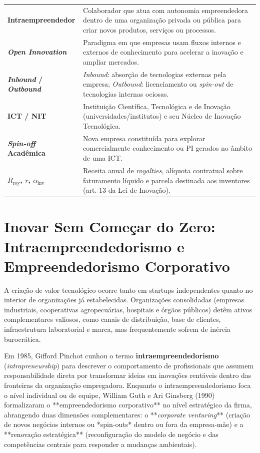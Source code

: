 
\begin{boxSimbolo}
  \begin{tabularx}{\textwidth}{@{}l >{\raggedright\arraybackslash}X@{}}
    \textbf{Intraempreendedor} & Colaborador que atua com autonomia empreendedora dentro de uma organização privada ou pública para criar novos produtos, serviços ou processos. \\
    \textbf{\textit{Open Innovation}} & Paradigma em que empresas usam fluxos internos e externos de conhecimento para acelerar a inovação e ampliar mercados. \\
    \textbf{\textit{Inbound} / \textit{Outbound}} & \textit{Inbound}: absorção de tecnologias externas pela empresa; \textit{Outbound}: licenciamento ou \textit{spin-out} de tecnologias internas ociosas. \\
    \textbf{ICT / NIT} & Instituição Científica, Tecnológica e de Inovação (universidades/institutos) e seu Núcleo de Inovação Tecnológica. \\
    \textbf{\textit{Spin-off} Acadêmica} & Nova empresa constituída para explorar comercialmente conhecimento ou PI gerados no âmbito de uma ICT. \\
    \textbf{$R_{\text{roy}}$, $r$, $\alpha_{\text{inv}}$} & Receita anual de \textit{royalties}, alíquota contratual sobre faturamento líquido e parcela destinada aos inventores (art. 13 da Lei de Inovação). \\
  \end{tabularx}
\end{boxSimbolo}

\section{Inovar Sem Começar do Zero: Intraempreendedorismo e Empreendedorismo Corporativo}

A criação de valor tecnológico ocorre tanto em startups independentes quanto no interior de organizações já estabelecidas. Organizações consolidadas (empresas industriais, cooperativas agropecuárias, hospitais e órgãos públicos) detêm ativos complementares valiosos, como canais de distribuição, base de clientes, infraestrutura laboratorial e marca, mas frequentemente sofrem de inércia burocrática.

Em 1985, Gifford Pinchot cunhou o termo \textbf{intraempreendedorismo} (\textit{intrapreneurship}) para descrever o comportamento de profissionais que assumem responsabilidade direta por transformar ideias em inovações rentáveis dentro das fronteiras da organização empregadora. Enquanto o intraempreendedorismo foca o nível individual ou de equipe, William Guth e Ari Ginsberg (1990) formalizaram o **empreendedorismo corporativo** no nível estratégico da firma, abrangendo duas dimensões complementares: o **\textit{corporate venturing}** (criação de novos negócios internos ou *spin-outs* dentro ou fora da empresa-mãe) e a **renovação estratégica** (reconfiguração do modelo de negócio e das competências centrais para responder a mudanças ambientais).

